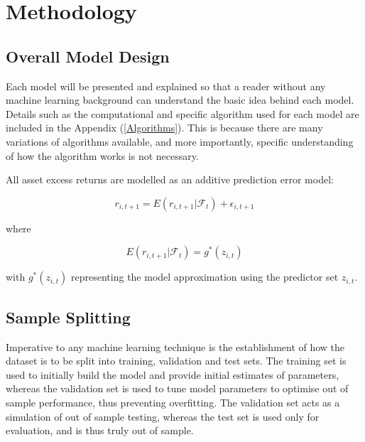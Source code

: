 \documentclass[a4paper]{article}
\begin{document}
	
	\section{Methodology}
	
	\subsection{Overall Model Design}
	
	Each model will be presented and explained so that a reader without any machine learning background can understand the basic idea behind each model. Details such as the computational and specific algorithm used for each model are included in the Appendix (\ref{Algorithms}). This is because there are many variations of algorithms available, and more importantly, specific understanding of how the algorithm works is not necessary. 
	
	All asset excess returns are modelled as an additive prediction error model:
	
	\begin{equation}
	r_{i, t+1} = E(r_{i, t+1} | \mathcal{F}_t) + \epsilon_{i, t+1}
	\end{equation}
	
	where 
	
	\begin{equation}
	E(r_{i, t+1} | \mathcal{F}_t) = g^*(z_{i,t})
	\end{equation}
	
	with $g^*(z_{i,t})$ representing the model approximation using the predictor set $z_{i,t}$.
	
	\subsection{Sample Splitting}
	
	Imperative to any machine learning technique is the establishment of how the dataset is to be split into training, validation and test sets. The training set is used to initially build the model and provide initial estimates of parameters, whereas the validation set is used to tune model parameters to optimise out of sample performance, thus preventing overfitting. The validation set acts as a simulation of out of sample testing, whereas the test set is used only for evaluation, and is thus truly out of sample.
	
\end{document}
